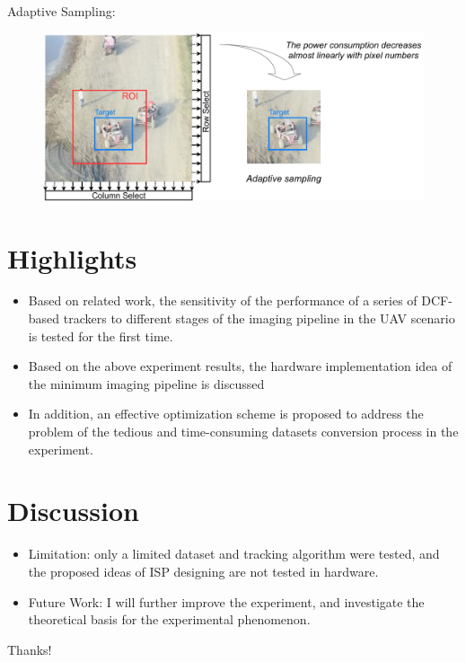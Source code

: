\documentclass{beamer}
\begin{document}
\begin{frame}
    Adaptive Sampling:
    \begin{figure}[htpb]
        \begin{center}
            \includegraphics[width=0.7\linewidth]{fig/ad_s.pdf}
        \end{center}
    \end{figure}
\end{frame}

\section{Highlights}

\begin{frame}
    \begin{itemize}[<+-| alert@+>]
        \item Based on related work, the sensitivity of the performance of a series of DCF-based trackers to different stages of the imaging pipeline in the UAV scenario is tested for the first time.
        \item Based on the above experiment results, the hardware implementation idea of the minimum imaging pipeline is discussed
        \item In addition, an effective optimization scheme is proposed to address the problem of the tedious and time-consuming datasets conversion process in the experiment.
    \end{itemize}
\end{frame}

\section{Discussion}

\begin{frame}
    \begin{itemize}[<+-| alert@+>]
        \item Limitation: only a limited dataset and tracking algorithm were tested, and the proposed ideas of ISP designing are not tested in hardware.
        \item Future Work: I will further improve the experiment, and investigate the theoretical basis for the experimental phenomenon.
    \end{itemize}
\end{frame}

\begin{frame}
    \begin{center}
        {\Huge\calligra Thanks!}
    \end{center}
\end{frame}
\end{document}
